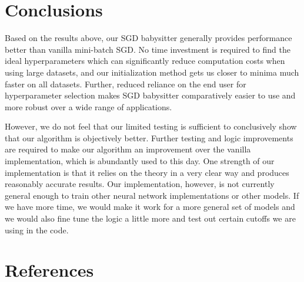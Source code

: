 \documentclass{article}
\begin{document}
\section{Conclusions}
\par Based on the results above, our SGD babysitter generally provides performance better than vanilla mini-batch SGD. No time investment is required to find the ideal hyperparameters which can significantly reduce computation costs when using large datasets, and our initialization method gets us closer to minima much faster on all datasets. Further, reduced reliance on the end user for hyperparameter selection makes SGD babysitter comparatively easier to use and more robust over a wide range of applications. 

\par However, we do not feel that our limited testing is sufficient to conclusively show that our algorithm is objectively better. Further testing and logic improvements are required to make our algorithm an improvement over the vanilla implementation, which is abundantly used to this day. One strength of our implementation is that it relies on the theory in a very clear way and produces reasonably accurate results. Our implementation, however, is not currently general enough to train other neural network implementations or other models. If we have more time, we would make it work for a more general set of models and we would also fine tune the logic a little more and test out certain cutoffs we are using in the code. 
 
\newpage
\section{References}
\end{document}
